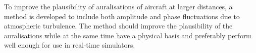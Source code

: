 To improve the plausibility of auralisations of aircraft at larger distances, a
method is developed to include both amplitude and phase fluctuations due to
atmospheric turbulence. The method should improve the plausibility of the
auralisations while at the same time have a physical basis and preferably
perform well enough for use in real-time simulators.



%
%
%

